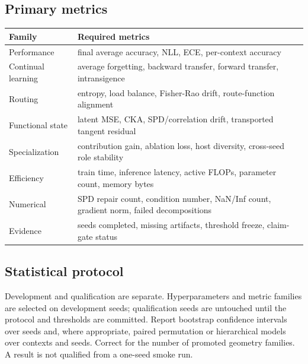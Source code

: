 \subsection{Primary metrics}
\begin{center}
\begin{tabularx}{\textwidth}{@{}lX@{}}
\toprule
Family & Required metrics \\
\midrule
Performance & final average accuracy, NLL, ECE, per-context accuracy \\
Continual learning & average forgetting, backward transfer, forward transfer, intransigence \\
Routing & entropy, load balance, Fisher-Rao drift, route-function alignment \\
Functional state & latent MSE, CKA, SPD/correlation drift, transported tangent residual \\
Specialization & contribution gain, ablation loss, host diversity, cross-seed role stability \\
Efficiency & train time, inference latency, active FLOPs, parameter count, memory bytes \\
Numerical & SPD repair count, condition number, NaN/Inf count, gradient norm, failed decompositions \\
Evidence & seeds completed, missing artifacts, threshold freeze, claim-gate status \\
\bottomrule
\end{tabularx}
\end{center}

\subsection{Statistical protocol}
Development and qualification are separate. Hyperparameters and metric families are selected on development seeds; qualification seeds are untouched until the protocol and thresholds are committed. Report bootstrap confidence intervals over seeds and, where appropriate, paired permutation or hierarchical models over contexts and seeds. Correct for the number of promoted geometry families. A result is not qualified from a one-seed smoke run.

